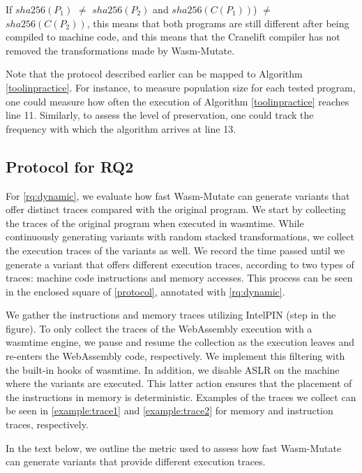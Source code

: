 \documentclass[a4paper,fleqn]{cas-dc}
\newcommand{\tool}{{\sc Wasm-Mutate}\xspace}
\newcommand{\Wasm}{WebAssembly\xspace}
\newcommand*\step[1]{
\noindent\tikz[baseline=(char.base)]{
        \node[shape=circle,text=black,draw=black, fill=white,inner sep=1.2pt] (char) {#1};}}
\begin{document}
If  $sha256(P_1)$ $\neq$ $sha256(P_2)$ and $sha256(C(P_1))$) $\neq$ $sha256(C(P_2))$, this means that  both programs are still different after being compiled to machine code, and this means that the Cranelift compiler has not removed the transformations made by \tool.  

Note that the protocol described earlier can be mapped to Algorithm \autoref{toolinpractice}. 
For instance, to measure population size for each tested program, one could measure how often the execution of Algorithm \autoref{toolinpractice} reaches line 11. 
Similarly, to assess the level of preservation, one could track the frequency with which the algorithm arrives at line 13.

\subsection{Protocol for RQ2}
\newcommand{\samples}{100\xspace}

For \ref{rq:dynamic}, we evaluate how fast \tool can generate variants that offer distinct traces compared with the original program.
We start by collecting the traces of the original program when executed in wasmtime.
While continuously generating variants with random stacked transformations, we collect the execution traces of the variants as well.
We record the time passed until we generate a variant that offers different execution traces, according to two types of traces: machine code instructions and memory accesses.
This process can be seen in the enclosed square of \autoref{protocol}, annotated with \ref{rq:dynamic}.


We gather the instructions and memory traces utilizing IntelPIN \cite{luk2005pin, 10.1145/3478520} (step \step{4} in the figure).
To only collect the traces of the \Wasm execution with a wasmtime engine, we pause and resume the collection as the execution leaves and re-enters the \Wasm code, respectively.
We implement this filtering with the built-in hooks of wasmtime.
In addition, we disable ASLR on the machine where the variants are executed.
This latter action ensures that the placement of the instructions in memory is deterministic.
Examples of the traces we collect can be seen in \autoref{example:trace1} and \autoref{example:trace2} for memory and instruction traces, respectively.



In the text below, we outline the metric used to assess how fast \tool can generate variants that provide different execution traces.
\end{document}
